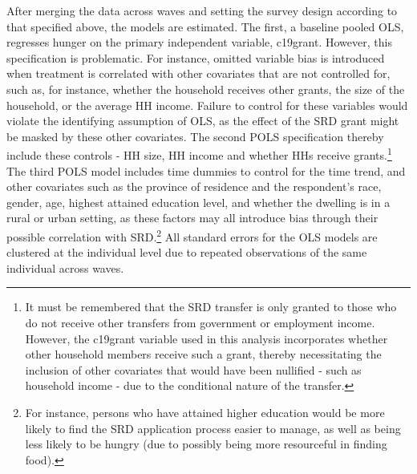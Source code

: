 \documentclass[11pt,preprint, authoryear]{elsarticle}
\numberwithin{equation}{section}
\numberwithin{figure}{section}
\numberwithin{table}{section}
\let\rmarkdownfootnote\footnote%
\def\footnote{\protect\rmarkdownfootnote}
\begin{document}
After merging the data across waves and setting the survey design
according to that specified above, the models are estimated. The first,
a baseline pooled OLS, regresses hunger on the primary independent
variable, c19grant. However, this specification is problematic. For
instance, omitted variable bias is introduced when treatment is
correlated with other covariates that are not controlled for, such as,
for instance, whether the household receives other grants, the size of
the household, or the average HH income. Failure to control for these
variables would violate the identifying assumption of OLS, as the effect
of the SRD grant might be masked by these other covariates. The second
POLS specification thereby include these controls - HH size, HH income
and whether HHs receive grants.\footnote{It must be remembered that the
  SRD transfer is only granted to those who do not receive other
  transfers from government or employment income. However, the c19grant
  variable used in this analysis incorporates whether other household
  members receive such a grant, thereby necessitating the inclusion of
  other covariates that would have been nullified - such as household
  income - due to the conditional nature of the transfer.} The third
POLS model includes time dummies to control for the time trend, and
other covariates such as the province of residence and the respondent's
race, gender, age, highest attained education level, and whether the
dwelling is in a rural or urban setting, as these factors may all
introduce bias through their possible correlation with SRD.\footnote{For
  instance, persons who have attained higher education would be more
  likely to find the SRD application process easier to manage, as well
  as being less likely to be hungry (due to possibly being more
  resourceful in finding food).} All standard errors for the OLS models
are clustered at the individual level due to repeated observations of
the same individual across waves.
\end{document}
